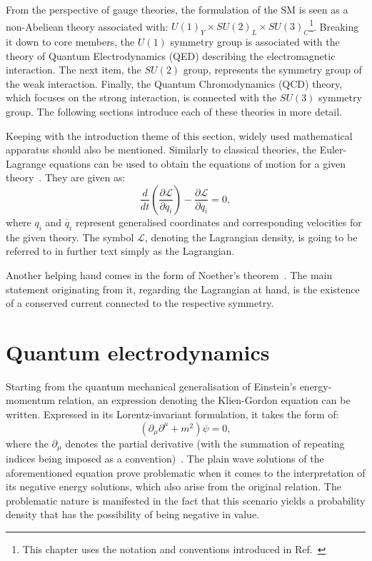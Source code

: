 \hspace{10pt} From the perspective of gauge theories, the formulation of the SM is seen as a non-Abeliean theory associated with: $U(1)_Y \times SU(2)_L \times  SU(3)_C$\footnote{This chapter uses the notation and conventions introduced in Ref.~\cite{thomson_2013}}. Breaking it down to core members, the $U(1)$ symmetry group is associated with the theory of Quantum Electrodynamics (QED) describing the electromagnetic interaction. The next item, the $SU(2)$ group, represents the symmetry group of the weak interaction. Finally, the Quantum Chromodynamics (QCD) theory, which focuses on the strong interaction, is connected with the $SU(3)$ symmetry group. The following sections introduce each of these theories in more detail. 

\hspace{10pt} Keeping with the introduction theme of this section, widely used mathematical apparatus should also be mentioned. Similarly to classical theories, the Euler-Lagrange equations can be used to obtain the equations of motion for a given theory~\cite{book:fox}. They are given as:
\begin{equation}
    \frac{d}{dt}\left ( \frac{\partial \mathcal{L}}{\partial q_i } \right ) - \frac{\partial \mathcal{L}}{\partial \dot{q_i}} =0,
\end{equation}
where $q_i$ and $\dot{q_i}$ represent generalised coordinates and corresponding velocities for the given theory. The symbol $\mathcal{L}$, denoting the Lagrangian density, is going to be referred to in further text simply as the Lagrangian.

\hspace{10pt} Another helping hand comes in the form of Noether's theorem~\cite{paper:noether}. The main statement originating from it, regarding the Lagrangian at hand, is the existence of a conserved current connected to the respective symmetry. 

\section{Quantum electrodynamics}
\hspace{10pt} Starting from the quantum mechanical generalisation of Einstein's energy-momentum relation, an expression denoting the Klien-Gordon equation can be written. Expressed in its Lorentz-invariant formulation, it takes the form of:
\begin{equation}
    (\partial_{\mu}\partial^{\mu}+m^2)\psi = 0,
\end{equation}
where the $\partial_\mu$ denotes the partial derivative (with the summation of repeating indices being imposed as a convention)~\cite{thomson_2013,book:schwartz}. The plain wave solutions of the aforementioned equation prove problematic when it comes to the interpretation of its negative energy solutions, which also arise from the original relation. The problematic nature is manifested in the fact that this scenario yields a probability density that has the possibility of being negative in value.

